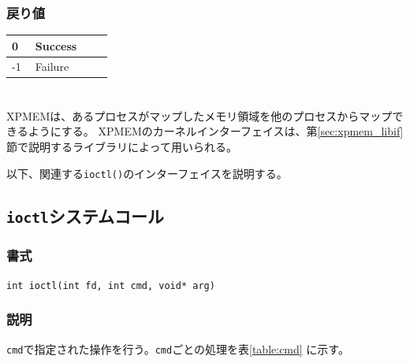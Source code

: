 \documentclass[twoside,11pt,fleqn]{book}
\begin{document}
\subsubsection*{戻り値}{\quad}
\begin{table}[!h]
\footnotesize
\begin{tabular}{|p{0.20\linewidth}|p{0.66\linewidth}|} \hline
0&Success\\ \hline
-1&Failure\\ \hline
\end{tabular}
\vspace{-0em}
\end{table}
\FloatBarrier

\section{}
XPMEMは、あるプロセスがマップしたメモリ領域を他のプロセスからマップできるようにする。
XPMEMのカーネルインターフェイスは、第\ref{sec:xpmem_libif}節で説明するライブラリによって用いられる。

以下、関連する\texttt{ioctl()}のインターフェイスを説明する。

\subsection{\texttt{ioctl}システムコール}
\subsubsection*{書式}{\quad} \texttt{int ioctl(int fd, int cmd, void* arg)}
\subsubsection*{説明}{\quad}
\texttt{cmd}で指定された操作を行う。\texttt{cmd}ごとの処理を表\ref{table:cmd} に示す。
\end{document}
